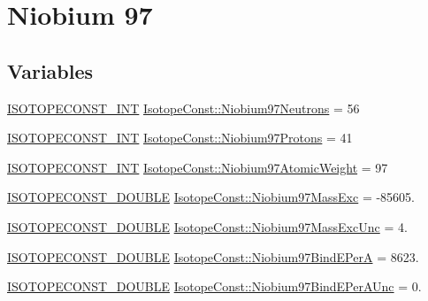 \hypertarget{group___isotope_const-_niobium-_nb97}{}\section{Niobium 97}
\label{group___isotope_const-_niobium-_nb97}
\subsection*{Variables}
\begin{DoxyCompactItemize}
\item 
\mbox{\hyperlink{group___isotope_const-_macros_ga5f18360b3e99483a35c32d789e62621c}{I\+S\+O\+T\+O\+P\+E\+C\+O\+N\+S\+T\+\_\+\+I\+NT}} \mbox{\hyperlink{group___isotope_const-_niobium-_nb97_gab04fb8846c501b4a0505c5d8cdd3b966}{Isotope\+Const\+::\+Niobium97\+Neutrons}} = 56
\item 
\mbox{\hyperlink{group___isotope_const-_macros_ga5f18360b3e99483a35c32d789e62621c}{I\+S\+O\+T\+O\+P\+E\+C\+O\+N\+S\+T\+\_\+\+I\+NT}} \mbox{\hyperlink{group___isotope_const-_niobium-_nb97_ga52d92eb9d263cf3c937551af02fef19b}{Isotope\+Const\+::\+Niobium97\+Protons}} = 41
\item 
\mbox{\hyperlink{group___isotope_const-_macros_ga5f18360b3e99483a35c32d789e62621c}{I\+S\+O\+T\+O\+P\+E\+C\+O\+N\+S\+T\+\_\+\+I\+NT}} \mbox{\hyperlink{group___isotope_const-_niobium-_nb97_gafc54b1d8c2c86e308ddf5ffa4666bd70}{Isotope\+Const\+::\+Niobium97\+Atomic\+Weight}} = 97
\item 
\mbox{\hyperlink{group___isotope_const-_macros_ga8f45a7272ce02c0b4c65c44636ed719a}{I\+S\+O\+T\+O\+P\+E\+C\+O\+N\+S\+T\+\_\+\+D\+O\+U\+B\+LE}} \mbox{\hyperlink{group___isotope_const-_niobium-_nb97_ga4d68d83690a7872b4ce00f6916dd2d6e}{Isotope\+Const\+::\+Niobium97\+Mass\+Exc}} = -\/85605.
\item 
\mbox{\hyperlink{group___isotope_const-_macros_ga8f45a7272ce02c0b4c65c44636ed719a}{I\+S\+O\+T\+O\+P\+E\+C\+O\+N\+S\+T\+\_\+\+D\+O\+U\+B\+LE}} \mbox{\hyperlink{group___isotope_const-_niobium-_nb97_ga0252a5e80ed5c930bfa1c67af068b629}{Isotope\+Const\+::\+Niobium97\+Mass\+Exc\+Unc}} = 4.
\item 
\mbox{\hyperlink{group___isotope_const-_macros_ga8f45a7272ce02c0b4c65c44636ed719a}{I\+S\+O\+T\+O\+P\+E\+C\+O\+N\+S\+T\+\_\+\+D\+O\+U\+B\+LE}} \mbox{\hyperlink{group___isotope_const-_niobium-_nb97_ga91eaf7cc861e44720c07b42600818370}{Isotope\+Const\+::\+Niobium97\+Bind\+E\+PerA}} = 8623.
\item 
\mbox{\hyperlink{group___isotope_const-_macros_ga8f45a7272ce02c0b4c65c44636ed719a}{I\+S\+O\+T\+O\+P\+E\+C\+O\+N\+S\+T\+\_\+\+D\+O\+U\+B\+LE}} \mbox{\hyperlink{group___isotope_const-_niobium-_nb97_ga8710a5edf4ab3ceae558cf36778cc183}{Isotope\+Const\+::\+Niobium97\+Bind\+E\+Per\+A\+Unc}} = 0.

\end{DoxyCompactItemize}
